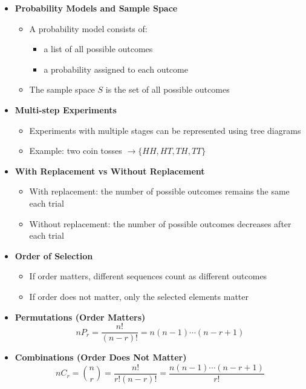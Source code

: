 \documentclass{article}
\begin{document}
\begin{itemize}
  \item \textbf{Probability Models and Sample Space}
  \begin{itemize}
    \item A probability model consists of:
    \begin{itemize}
      \item a list of all possible outcomes
      \item a probability assigned to each outcome
    \end{itemize}
    \item The sample space $S$ is the set of all possible outcomes
  \end{itemize}

  \item \textbf{Multi-step Experiments}
  \begin{itemize}
    \item Experiments with multiple stages can be represented using tree diagrams
    \item Example: two coin tosses $\rightarrow \{HH, HT, TH, TT\}$
  \end{itemize}

  \item \textbf{With Replacement vs Without Replacement}
  \begin{itemize}
    \item With replacement: the number of possible outcomes remains the same each trial
    \item Without replacement: the number of possible outcomes decreases after each trial
  \end{itemize}

  \item \textbf{Order of Selection}
  \begin{itemize}
    \item If order matters, different sequences count as different outcomes
    \item If order does not matter, only the selected elements matter
  \end{itemize}

  \item \textbf{Permutations (Order Matters)}
  \[
    nP_r = \frac{n!}{(n-r)!} = n(n-1) \cdots(n-r+1)
  \]

  \item \textbf{Combinations (Order Does Not Matter)}
  \[
    nC_r = \binom{n}{r} = \frac{n!}{r!(n-r)!} =  \frac{n(n-1) \cdots(n-r+1)}{r!}
  \]
\end{itemize}
\end{document}
